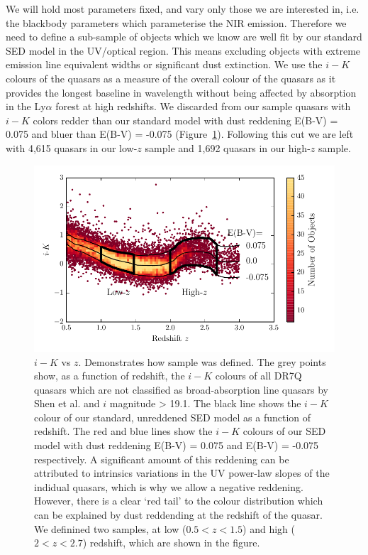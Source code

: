 We will hold most parameters fixed, and vary only those we are interested in, i.e. the blackbody parameters which parameterise the NIR emission. 
Therefore we need to define a sub-sample of objects which we know are well fit by our standard SED model in the UV/optical region. 
This means excluding objects with extreme emission line equivalent widths or significant dust extinction.
We use the $i-K$ colours of the quasars as a measure of the overall colour of the quasars as it provides the longest baseline in wavelength without being affected by absorption in the Ly$\alpha$ forest at high redshifts. 
We discarded from our sample quasars with $i - K$ colors redder than our standard model with dust reddening E(B-V) = 0.075 and bluer than E(B-V) = -0.075 (Figure~\ref{fig:ikzplot}). 
Following this cut we are left with 4,615 quasars in our low-$z$ sample and 1,692 quasars in our high-$z$ sample. 

\begin{figure}
  \centering
  \includegraphics[width=\columnwidth]{figures/chapter06/ik_versus_z_low_ext.pdf}
  \caption{$i-K$ vs $z$. Demonstrates how sample was defined. The grey points show, as a function of redshift, the $i-K$ colours of all DR7Q quasars which are not classified as broad-absorption line quasars by Shen et al. and $i$ magnitude > 19.1. The black line shows the $i-K$ colour of our standard, unreddened SED model as a function of redshift. The red and blue lines show the $i-K$ colours of our SED model with dust reddening E(B-V) = 0.075 and E(B-V) = -0.075 respectively. A significant amount of this reddening can be attributed to intrinsics variations in the UV power-law slopes of the indidual quasars, which is why we allow a negative reddening. However, there is a clear `red tail' to the colour distribution which can be explained by dust reddending at the redshift of the quasar. We definined two samples, at low ($0.5 < z < 1.5$) and high ($2 < z < 2.7$) redshift, which are shown in the figure.}
  \label{fig:ikzplot}
\end{figure}

